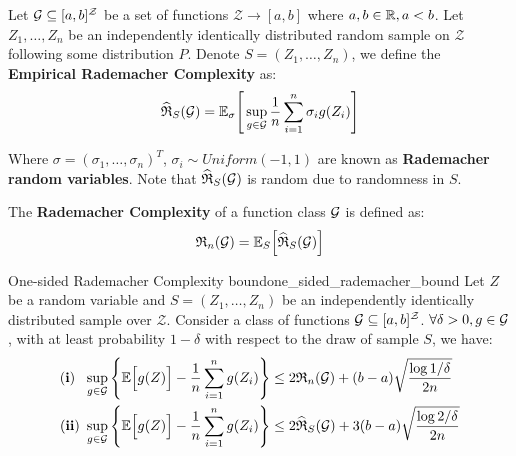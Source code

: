 \begin{definition}
    Let $\mathcal{G}\subseteq[a,b]^{\mathcal{Z}}$ be a set of functions $\mathcal{Z} \to [a, b]$ where $a,b\in\mathbb{R}, a < b$. Let $Z_1, \dots, Z_n$ be an independently identically distributed random sample on $\mathcal{Z}$ following some distribution $P$. Denote $S=(Z_1, \dots, Z_n)$, we define the \textbf{Empirical Rademacher Complexity} as:
    \begin{align*}
        \widehat{\mathfrak{R}}_S(\mathcal{G}) = \mathbb{E}_\sigma\Bigg[ 
            \sup_{g\in\mathcal{G}} \frac{1}{n}\sum_{i=1}^n \sigma_i g(Z_i)
         \Bigg]
    \end{align*}

    \noindent Where $\sigma=(\sigma_1, \dots, \sigma_n)^T$, $\sigma_i\sim Uniform(-1, 1)$ are known as \textbf{Rademacher random variables}. Note that $\widehat{\mathfrak{R}}_S(\mathcal{G})$ is random due to randomness in $S$.
\end{definition}

\begin{definition}
    The \textbf{Rademacher Complexity} of a function class $\mathcal{G}$ is defined as:
    \begin{align*}
        \mathfrak{R}_n(\mathcal{G}) = \mathbb{E}_S\Big[  \widehat{\mathfrak{R}}_S(\mathcal{G})  \Big]
    \end{align*}
\end{definition}

\begin{theorem}{One-sided Rademacher Complexity bound}{one_sided_rademacher_bound}
    Let $Z$ be a random variable and $S=(Z_1, \dots, Z_n)$ be an independently identically distributed sample over $\mathcal{Z}$. Consider a class of functions $\mathcal{G}\subseteq [a,b]^\mathcal{Z}$. $\forall \delta > 0, g\in\mathcal{G}$, with at least probability $1-\delta$ with respect to the draw of sample $S$, we have:
    \begin{align*}
        {\bf (i)} \ \ \sup_{g\in\mathcal{G}}\Bigg\{ \mathbb{E}\Big[ g(Z) \Big] - \frac{1}{n} \sum_{i=1}^n g(Z_i) \Bigg\} &\le 2\mathfrak{R}_n(\mathcal{G}) + (b-a)\sqrt{\frac{\log1/\delta}{2n}} \\
        {\bf (ii)} \  \sup_{g\in\mathcal{G}}\Bigg\{ \mathbb{E}\Big[ g(Z) \Big] - \frac{1}{n} \sum_{i=1}^n g(Z_i) \Bigg\} &\le 2\widehat{\mathfrak{R}}_S(\mathcal{G}) + 3(b-a)\sqrt{\frac{\log2/\delta}{2n}}
    \end{align*}
\end{theorem}

